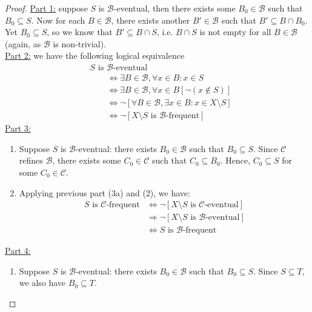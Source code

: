 \documentclass{treatise}
\begin{document}
\begin{proof}
\underline{Part 1:} suppose $S$ is $\mathcal{B}$-eventual, then there exists some $B_0 \in \mathcal{B}$ such that $B_0 \subseteq S$. Now for each $B \in \mathcal{B}$, there exists another $B' \in \mathcal{B}$ such that $B' \subseteq B \cap B_0$. Yet $B_0 \subseteq S$, so we know that $B' \subseteq B \cap S$, i.e. $B \cap S$ is not empty for all $B \in \mathcal{B}$ (again, as $\mathcal{B}$ is non-trivial).
\\
\underline{Part 2:} we have the following logical equivalence
\begin{align*}
    & S \mbox{ is } \mathcal{B} \mbox{-eventual}
    \\
    & \qquad \Leftrightarrow \exists B \in \mathcal{B}, \forall x \in B: x \in S
    \\
    & \qquad \Leftrightarrow \exists B \in \mathcal{B}, \forall x \in B [\neg (x \notin S)]
    \\
    & \qquad \Leftrightarrow \neg [\forall B \in \mathcal{B}, \exists x \in B: x \in X \setminus S]
    \\
    & \qquad \Leftrightarrow \neg [X \setminus S \mbox{ is } \mathcal{B} \mbox{-frequent}]
\end{align*}
\underline{Part 3:}
\begin{enumerate}[label=(\alph*)]
    \item Suppose $S$ is $\mathcal{B}$-eventual: there exists $B_0 \in \mathcal{B}$ such that $B_0 \subseteq S$. Since $\mathcal{C}$ refines $\mathcal{B}$, there exists some $C_0 \in \mathcal{C}$ such that $C_0 \subseteq B_0$. Hence, $C_0 \subseteq S$ for some $C_0 \in \mathcal{C}$.
    \item Applying previous part (3a) and (2), we have:
    \begin{align*}
        S \mbox{ is } \mathcal{C} \mbox{-frequent} & \Leftrightarrow \neg [X \setminus S \mbox{ is } \mathcal{C} \mbox{-eventual}]
        \\
        & \Rightarrow \neg [X \setminus S \mbox{ is } \mathcal{B} \mbox{-eventual}]
        \\
        & \Leftrightarrow S \mbox{ is } \mathcal{B} \mbox{-frequent}
    \end{align*}
\end{enumerate}
\underline{Part 4:}
\begin{enumerate}[label=(\alph*)]
    \item Suppose $S$ is $\mathcal{B}$-eventual: there exists $B_0 \in \mathcal{B}$ such that $B_0 \subseteq S$. Since $S \subseteq T$, we also have $B_0 \subseteq T$.

\end{enumerate}
\end{proof}
\end{document}
